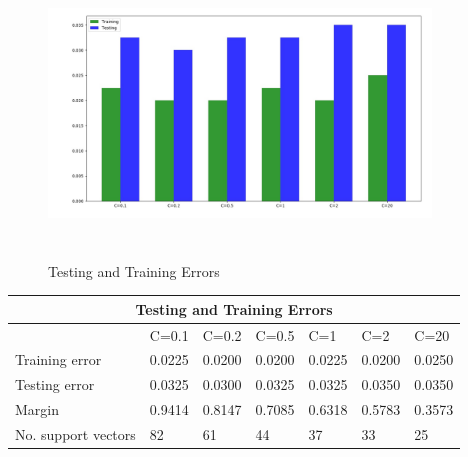 \documentclass{article}
\begin{document}
\newpage
\begin{figure}[h]
    \centering
    \includegraphics[width=4in,height=3in]{exercise_02_04_01_fig_08.jpg}
    \caption{Testing and Training Errors}
\end{figure}

\begin{center}
\begin{tabular}{ |p{3.5cm}|p{1cm}|p{1cm}|p{1cm}|p{1cm}|p{1cm}|p{1cm}| }
\hline
\multicolumn{7}{|c|}{Testing and Training Errors} \\
\hline
               & C=0.1 & C=0.2 & C=0.5 & C=1 & C=2 & C=20 \\
\hline
Training error & 0.0225 & 0.0200 & 0.0200 & 0.0225 & 0.0200 & 0.0250 \\
Testing error & 0.0325 & 0.0300 & 0.0325 & 0.0325 & 0.0350 & 0.0350 \\
Margin & 0.9414 & 0.8147 & 0.7085 & 0.6318 & 0.5783 & 0.3573 \\
No. support vectors  & 82 & 61 & 44 & 37 & 33 & 25\\
\hline
\end{tabular}
\end{center}

\end{document}
